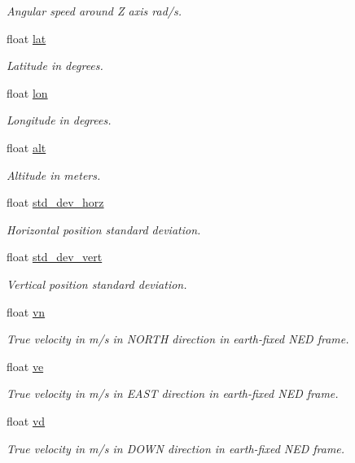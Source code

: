\begin{DoxyCompactItemize}
\begin{DoxyCompactList}\small\item\em Angular speed around Z axis rad/s. \end{DoxyCompactList}\item 
float \hyperlink{struct____mavlink__sim__state__t_a0f160cde80e89d62a8e1224646c6d2f9}{lat}
\begin{DoxyCompactList}\small\item\em Latitude in degrees. \end{DoxyCompactList}\item 
float \hyperlink{struct____mavlink__sim__state__t_abe7f252d4e917f15f5267b57a607d980}{lon}
\begin{DoxyCompactList}\small\item\em Longitude in degrees. \end{DoxyCompactList}\item 
float \hyperlink{struct____mavlink__sim__state__t_a2a8b47ade532ffc0a80aed65972d61f6}{alt}
\begin{DoxyCompactList}\small\item\em Altitude in meters. \end{DoxyCompactList}\item 
float \hyperlink{struct____mavlink__sim__state__t_a9a60403fc2a9ff47b8b2132972968617}{std\+\_\+dev\+\_\+horz}
\begin{DoxyCompactList}\small\item\em Horizontal position standard deviation. \end{DoxyCompactList}\item 
float \hyperlink{struct____mavlink__sim__state__t_a2176290431f1ee212e6d569e495a219f}{std\+\_\+dev\+\_\+vert}
\begin{DoxyCompactList}\small\item\em Vertical position standard deviation. \end{DoxyCompactList}\item 
float \hyperlink{struct____mavlink__sim__state__t_a7a3506208fd5f6d14bd68fc39f6f1f04}{vn}
\begin{DoxyCompactList}\small\item\em True velocity in m/s in N\+O\+R\+T\+H direction in earth-\/fixed N\+E\+D frame. \end{DoxyCompactList}\item 
float \hyperlink{struct____mavlink__sim__state__t_a1cf4dd8696eabaee1a9817bc5cae8cf1}{ve}
\begin{DoxyCompactList}\small\item\em True velocity in m/s in E\+A\+S\+T direction in earth-\/fixed N\+E\+D frame. \end{DoxyCompactList}\item 
float \hyperlink{struct____mavlink__sim__state__t_a057f5299b9dbad10fac6b7fce523aad7}{vd}
\begin{DoxyCompactList}\small\item\em True velocity in m/s in D\+O\+W\+N direction in earth-\/fixed N\+E\+D frame. \end{DoxyCompactList}\end{DoxyCompactItemize}


